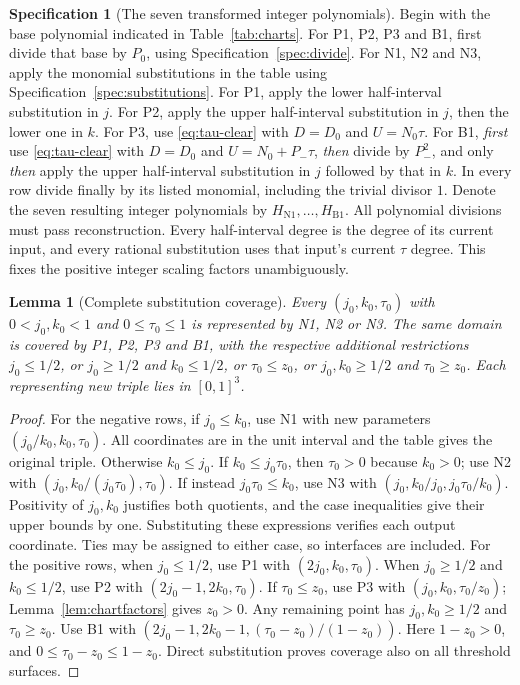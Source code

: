 \documentclass[11pt,a4paper]{article}
\newtheorem{lemma}{Lemma}[section]
\theoremstyle{definition}
\newtheorem{specification}{Specification}[section]
\begin{document}
\begin{specification}[The seven transformed integer polynomials]\label{spec:charts}
Begin with the base polynomial indicated in Table~\ref{tab:charts}.
For P1, P2, P3 and B1, first divide that base by $P_0$, using Specification~\ref{spec:divide}.
For N1, N2 and N3, apply the monomial substitutions in the table using Specification~\ref{spec:substitutions}.
For P1, apply the lower half-interval substitution in $j$. For P2, apply the upper half-interval substitution in $j$, then the lower one in $k$.
For P3, use \eqref{eq:tau-clear} with $D=D_0$ and $U=N_0\tau$.
For B1, \emph{first} use \eqref{eq:tau-clear} with $D=D_0$ and $U=N_0+P_-\tau$, \emph{then} divide by $P_-^2$, and only \emph{then} apply the upper half-interval substitution in $j$ followed by that in $k$.
In every row divide finally by its listed monomial, including the trivial divisor $1$. Denote the seven resulting integer polynomials by $H_{\mathrm{N1}},\ldots,H_{\mathrm{B1}}$.
All polynomial divisions must pass reconstruction. Every half-interval degree is the degree of its current input, and every rational substitution uses that input's current $\tau$ degree. This fixes the positive integer scaling factors unambiguously.
\end{specification}

\begin{lemma}[Complete substitution coverage]\label{lem:coverage}
Every $(j_0,k_0,\tau_0)$ with $0<j_0,k_0<1$ and $0\leq\tau_0\leq1$ is represented by N1, N2 or N3. The same domain is covered by P1, P2, P3 and B1, with the respective additional restrictions $j_0\leq1/2$, or $j_0\geq1/2$ and $k_0\leq1/2$, or $\tau_0\leq z_0$, or $j_0,k_0\geq1/2$ and $\tau_0\geq z_0$. Each representing new triple lies in $[0,1]^3$.
\end{lemma}
\begin{proof}
For the negative rows, if $j_0\leq k_0$, use N1 with new parameters $(j_0/k_0,k_0,\tau_0)$. All coordinates are in the unit interval and the table gives the original triple.
Otherwise $k_0\leq j_0$. If $k_0\leq j_0\tau_0$, then $\tau_0>0$ because $k_0>0$; use N2 with $(j_0,k_0/(j_0\tau_0),\tau_0)$. If instead $j_0\tau_0\leq k_0$, use N3 with $(j_0,k_0/j_0,j_0\tau_0/k_0)$. Positivity of $j_0,k_0$ justifies both quotients, and the case inequalities give their upper bounds by one. Substituting these expressions verifies each output coordinate. Ties may be assigned to either case, so interfaces are included.
For the positive rows, when $j_0\leq1/2$, use P1 with $(2j_0,k_0,\tau_0)$. When $j_0\geq1/2$ and $k_0\leq1/2$, use P2 with $(2j_0-1,2k_0,\tau_0)$. If $\tau_0\leq z_0$, use P3 with $(j_0,k_0,\tau_0/z_0)$; Lemma~\ref{lem:chartfactors} gives $z_0>0$. Any remaining point has $j_0,k_0\geq1/2$ and $\tau_0\geq z_0$. Use B1 with
$(2j_0-1,2k_0-1,(\tau_0-z_0)/(1-z_0))$.
Here $1-z_0>0$, and $0\leq\tau_0-z_0\leq1-z_0$. Direct substitution proves coverage also on all threshold surfaces.
\end{proof}
\end{document}
